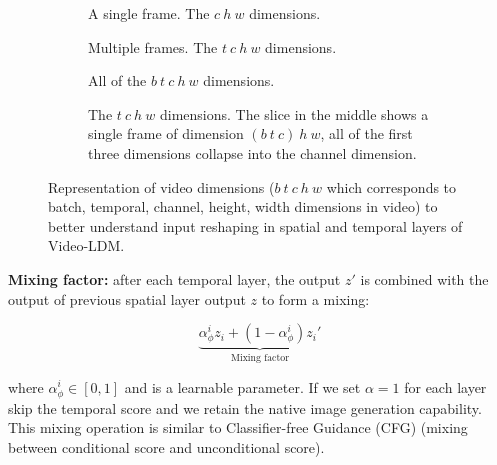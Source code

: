 \begin{figure}
    \centering

    \begin{subfigure}{0.3\textwidth}
        \centering
        \scalebox{0.6}{
            
        }
        \caption{A single frame. The $c\ h\ w$ dimensions.}
    \end{subfigure}

    \begin{subfigure}{0.3\textwidth}
        \centering
        \scalebox{0.6}{
            
        }
        \caption{Multiple frames. The $t\ c\ h\ w$ dimensions.}
    \end{subfigure}

    \begin{subfigure}{0.7\textwidth}
        \centering
        \scalebox{0.6}{
            
        }
        \caption{All of the $b\ t\ c\ h\ w$ dimensions. }
    \end{subfigure}

    \begin{subfigure}{0.7\textwidth}
        \centering
        \scalebox{0.6}{
            
        }
        \caption{The $t\ c\ h\ w$ dimensions. The slice in the middle shows a single frame of dimension $(b\ t\ c)\ h\ w$, all of the first three dimensions collapse into the channel dimension.}
    \end{subfigure}

    \caption{Representation of video dimensions ($b\ t\ c\ h\ w$ which corresponds to batch, temporal, channel, height, width dimensions in video) to better understand input reshaping in spatial and temporal layers of Video-LDM.}
\end{figure}





\textbf{Mixing factor:} after each temporal layer, the output $z'$ is combined with the output of previous spatial layer output $z$ to form a mixing: 

\[ \underbrace{\alpha_\phi^i z_{i} + (1 - \alpha_\phi^i) z_{i}'}_{\text{Mixing factor}} \] 

where $\alpha_\phi^i \in [0, 1]$ and is a learnable parameter. If we set $\alpha = 1$ for each layer skip the temporal score and we retain the native image generation capability. This mixing operation is similar to Classifier-free Guidance (CFG) (mixing between conditional score and unconditional score).

